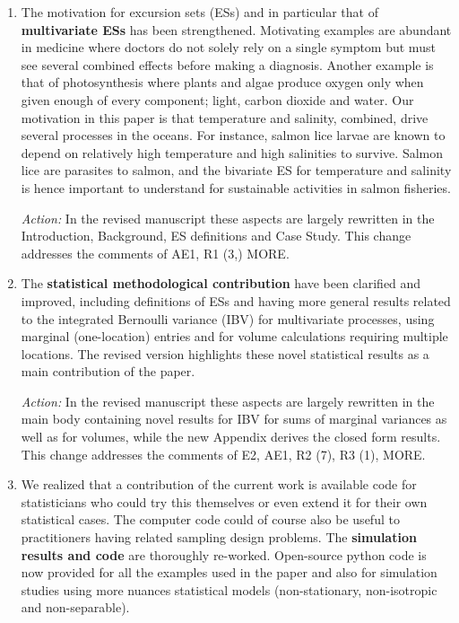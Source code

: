 \documentclass[a4paper]{article}
\begin{document}
\begin{enumerate}
\item The motivation for excursion sets (ESs) and in particular that of {\bf{multivariate ESs}} has been strengthened. Motivating examples are abundant in medicine where doctors do not solely rely on a single symptom but must see several combined effects before making a diagnosis. Another example is that of photosynthesis where plants and algae produce oxygen only when given enough of every component; light, carbon dioxide and water. Our motivation in this paper is that temperature and salinity, combined, drive several processes in the oceans. For instance, salmon lice larvae are known to depend on relatively high temperature and high salinities to survive. Salmon lice are parasites to salmon, and the bivariate ES for temperature and salinity is hence important to understand for sustainable activities in salmon fisheries.

{\it{Action:}} In the revised manuscript these aspects are largely rewritten in the Introduction, Background, ES definitions and Case Study. This change addresses the comments of AE1, R1 (3,) MORE.

\item The {\bf{statistical methodological contribution}} have been clarified and improved, including definitions of ESs and having more general results related to the integrated Bernoulli variance (IBV) for multivariate processes, using marginal (one-location) entries and for volume calculations requiring multiple locations. The revised version highlights these novel statistical results as a main contribution of the paper. 

{\it{Action:}} In the revised manuscript these aspects are largely rewritten in the main body containing novel results for IBV for sums of marginal variances as well as for volumes, while the new Appendix derives the closed form results. This change addresses the comments of E2, AE1, R2 (7), R3 (1), MORE.

\item We realized that a contribution of the current work is available code for statisticians who could try this themselves or even extend it for their own statistical cases. The computer code could of course also be useful to practitioners having related sampling design problems. The {\bf{simulation results and code}} are thoroughly re-worked. Open-source python code is now provided for all the examples used in the paper and also for simulation studies using more nuances statistical models (non-stationary, non-isotropic and non-separable). 


\end{enumerate}
\end{document}
